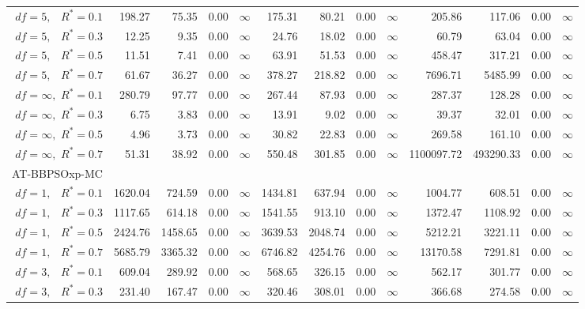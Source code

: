 \documentclass[12pt]{article}
\begin{document}
\begin{table}[ht]
{\begin{tabular}{r|rrrr|rrrr|rrrr}
  $df = 5,\enspace$ $R^* =0.1$ & 198.27 & 75.35 & 0.00 & $\infty$ & 175.31 & 80.21 & 0.00 & $\infty$ & 205.86 & 117.06 & 0.00 & $\infty$ \\ 
  $df = 5,\enspace$ $R^* =0.3$ & 12.25 & 9.35 & 0.00 & $\infty$ & 24.76 & 18.02 & 0.00 & $\infty$ & 60.79 & 63.04 & 0.00 & $\infty$ \\ 
  $df = 5,\enspace$ $R^* =0.5$ & 11.51 & 7.41 & 0.00 & $\infty$ & 63.91 & 51.53 & 0.00 & $\infty$ & 458.47 & 317.21 & 0.00 & $\infty$ \\ 
  $df = 5,\enspace$ $R^* =0.7$ & 61.67 & 36.27 & 0.00 & $\infty$ & 378.27 & 218.82 & 0.00 & $\infty$ & 7696.71 & 5485.99 & 0.00 & $\infty$ \\ 
  $df = \infty,$ $R^* =0.1$ & 280.79 & 97.77 & 0.00 & $\infty$ & 267.44 & 87.93 & 0.00 & $\infty$ & 287.37 & 128.28 & 0.00 & $\infty$ \\ 
  $df = \infty,$ $R^* =0.3$ & 6.75 & 3.83 & 0.00 & $\infty$ & 13.91 & 9.02 & 0.00 & $\infty$ & 39.37 & 32.01 & 0.00 & $\infty$ \\ 
  $df = \infty,$ $R^* =0.5$ & 4.96 & 3.73 & 0.00 & $\infty$ & 30.82 & 22.83 & 0.00 & $\infty$ & 269.58 & 161.10 & 0.00 & $\infty$ \\ 
  $df = \infty,$ $R^* =0.7$ & 51.31 & 38.92 & 0.00 & $\infty$ & 550.48 & 301.85 & 0.00 & $\infty$ & 1100097.72 & 493290.33 & 0.00 & $\infty$ \\ 
\hline
\multicolumn{1}{l|}{AT-BBPSOxp-MC} &&&&&&&&&&&&\\
  $df = 1,\enspace$ $R^* =0.1$ & 1620.04 & 724.59 & 0.00 & $\infty$ & 1434.81 & 637.94 & 0.00 & $\infty$ & 1004.77 & 608.51 & 0.00 & $\infty$ \\ 
  $df = 1,\enspace$ $R^* =0.3$ & 1117.65 & 614.18 & 0.00 & $\infty$ & 1541.55 & 913.10 & 0.00 & $\infty$ & 1372.47 & 1108.92 & 0.00 & $\infty$ \\ 
  $df = 1,\enspace$ $R^* =0.5$ & 2424.76 & 1458.65 & 0.00 & $\infty$ & 3639.53 & 2048.74 & 0.00 & $\infty$ & 5212.21 & 3221.11 & 0.00 & $\infty$ \\ 
  $df = 1,\enspace$ $R^* =0.7$ & 5685.79 & 3365.32 & 0.00 & $\infty$ & 6746.82 & 4254.76 & 0.00 & $\infty$ & 13170.58 & 7291.81 & 0.00 & $\infty$ \\ 
  $df = 3,\enspace$ $R^* =0.1$ & 609.04 & 289.92 & 0.00 & $\infty$ & 568.65 & 326.15 & 0.00 & $\infty$ & 562.17 & 301.77 & 0.00 & $\infty$ \\ 
  $df = 3,\enspace$ $R^* =0.3$ & 231.40 & 167.47 & 0.00 & $\infty$ & 320.46 & 308.01 & 0.00 & $\infty$ & 366.68 & 274.58 & 0.00 & $\infty$ \\ 

\end{tabular}}
\end{table}
\end{document}
